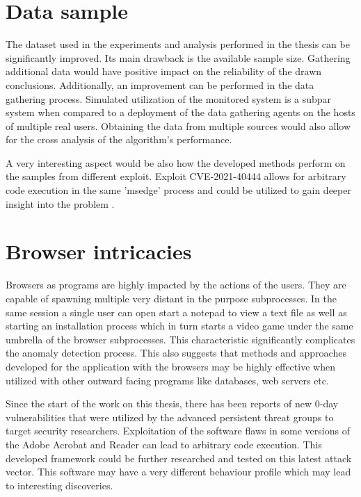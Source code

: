 \documentclass[a4paper,twoside,12pt]{book}
\begin{document}
\section{Data sample}

The dataset used in the experiments and analysis performed in the thesis can be significantly 
improved. Its main drawback is the available sample size. Gathering additional data would have
positive impact on the reliability of the drawn conclusions. Additionally, an improvement 
can be performed in the data gathering process. Simulated utilization of the monitored system
is a subpar system when compared to a deployment of the data gathering agents on the hosts of 
multiple real users. Obtaining the data from multiple sources would also allow for the cross
analysis of the algorithm's performance. 

A very interesting aspect would be also how the developed methods perform on the samples from 
different exploit. Exploit CVE-2021-40444 allows for arbitrary code execution in the same 'msedge'
process and could be utilized to gain deeper insight into the problem \cite{bib:newEdgeExploit}.

\section{Browser intricacies}

Browsers as programs are highly impacted by the actions of the users. They are capable of spawning
multiple very distant in the purpose subprocesses. In the same session a single user can open start
a notepad to view a text file as well as starting an installation process which in turn starts a 
video game under the same umbrella of the browser subprocesses. This characteristic significantly
complicates the anomaly detection process. This also suggests that methods and approaches developed
for the application with the browsers may be highly effective when utilized with other outward 
facing programs like databases, web servers etc.

Since the start of the work on this thesis, there has been reports of new 0-day vulnerabilities that were
utilized by the advanced persistent threat groups to target security researchers. Exploitation of the
software flaws in some versions of the Adobe Acrobat and Reader can lead to arbitrary code execution\cite{bib:AdobeExploit}.
This developed framework could be further researched and tested on this latest attack vector. This 
software may have a very different behaviour profile which may lead to interesting discoveries.
\end{document}
